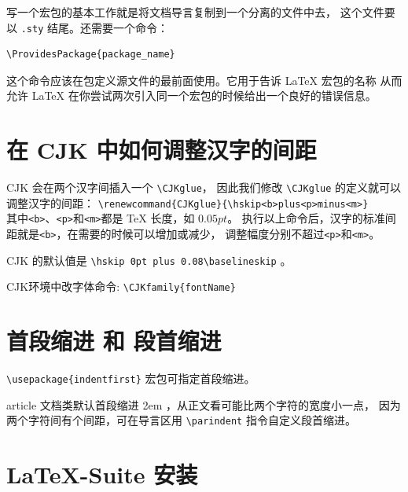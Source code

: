 \documentclass[a4paper,11pt]{article}
\begin{document}
写一个宏包的基本工作就是将文档导言复制到一个分离的文件中去，
这个文件要以 \verb+.sty+ 结尾。还需要一个命令：
\begin{Verbatim}
\ProvidesPackage{package_name}
\end{Verbatim}

这个命令应该在包定义源文件的最前面使用。它用于告诉 \LaTeX{} 宏包的名称%
从而允许 \LaTeX{} 在你尝试两次引入同一个宏包的时候给出一个良好的错误信息。

\section{在 CJK 中如何调整汉字的间距}
CJK 会在两个汉字间插入一个 \verb+\CJKglue+，
因此我们修改 \verb+\CJKglue+ 的定义就可以调整汉字的间距：
\verb+\renewcommand{CJKglue}{\hskip<b>plus<p>minus<m>}+\\
其中\verb+<b>+、\verb+<p>+和\verb+<m>+都是 \TeX{} 长度，如 $0.05pt$。
执行以上命令后，汉字的标准间距就是\verb+<b>+，在需要的时候可以增加或减少，
调整幅度分别不超过\verb+<p>+和\verb+<m>+。

CJK 的默认值是 \verb+\hskip 0pt plus 0.08\baselineskip+ 。

CJK环境中改字体命令: \verb+\CJKfamily{fontName}+

\section{首段缩进 和 段首缩进}
\verb+\usepackage{indentfirst}+ 宏包可指定首段缩进。

article 文档类默认首段缩进 2em ，从正文看可能比两个字符的宽度小一点，
因为两个字符间有个间距，可在导言区用 \verb+\parindent+ 指令自定义段首缩进。

\section{\LaTeX{}-Suite 安装}
\end{document}

